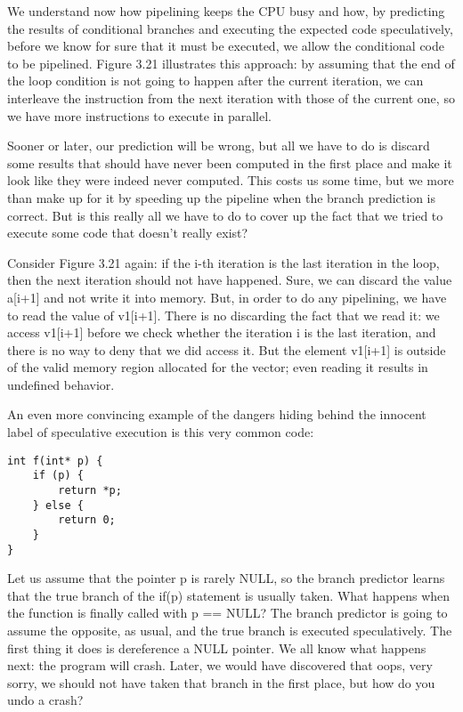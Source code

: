 

We understand now how pipelining keeps the CPU busy and how, by predicting the results of conditional branches and executing the expected code speculatively, before we know for sure that it must be executed, we allow the conditional code to be pipelined. Figure 3.21 illustrates this approach: by assuming that the end of the loop condition is not going to happen after the current iteration, we can interleave the instruction from the next iteration with those of the current one, so we have more instructions to execute in parallel.

Sooner or later, our prediction will be wrong, but all we have to do is discard some results that should have never been computed in the first place and make it look like they were indeed never computed. This costs us some time, but we more than make up for it by speeding up the pipeline when the branch prediction is correct. But is this really all we have to do to cover up the fact that we tried to execute some code that doesn't really exist?

Consider Figure 3.21 again: if the i-th iteration is the last iteration in the loop, then the next iteration should not have happened. Sure, we can discard the value a[i+1] and not write it into memory. But, in order to do any pipelining, we have to read the value of v1[i+1]. There is no discarding the fact that we read it: we access v1[i+1] before we check whether the iteration i is the last iteration, and there is no way to deny that we did access it. But the element v1[i+1] is outside of the valid memory region allocated for the vector; even reading it results in undefined behavior.

An even more convincing example of the dangers hiding behind the innocent label of speculative execution is this very common code:

\begin{lstlisting}[style=styleCXX]
int f(int* p) {
	if (p) {
		return *p;
	} else {
		return 0;
	}
}
\end{lstlisting}

Let us assume that the pointer p is rarely NULL, so the branch predictor learns that the true branch of the if(p) statement is usually taken. What happens when the function is finally called with p == NULL? The branch predictor is going to assume the opposite, as usual, and the true branch is executed speculatively. The first thing it does is dereference a NULL pointer. We all know what happens next: the program will crash. Later, we would have discovered that oops, very sorry, we should not have taken that branch in the first place, but how do you undo a crash?

